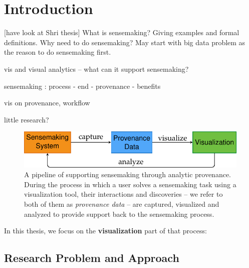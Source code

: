 \chapter{Introduction}

\graphicspath{{Chapter1/figures/}}

[have look at Shri thesis]
What is sensemaking? Giving examples and formal definitions. Why need to do sensemaking? May start with big data problem as the reason to do sensemaking first.

vis and visual analytics -- what can it support sensemaking?

sensemaking : process - end - provenance - benefits

vis on provenance, workflow

little research?


\begin{figure}[!htb]
	\centering
	\includegraphics{workflow}
	\caption{A pipeline of supporting sensemaking through analytic provenance. During the process in which a user solves a sensemaking task using a visualization tool, their interactions and discoveries -- we refer to both of them as \emph{provenance data} -- are captured, visualized and analyzed to provide support back to the sensemaking process.}
	\label{fig:workflow}
\end{figure}
In this thesis, we focus on the \textbf{visualization} part of that process:
\begin{center}
\end{center}


\section{Research Problem and Approach}
